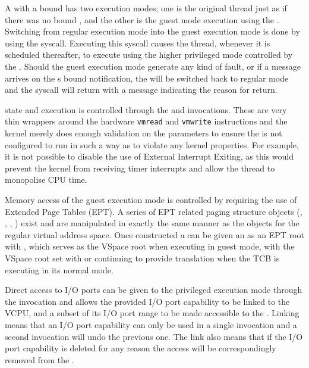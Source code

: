 A  with a bound  has two execution modes; one is the original thread just as
if there was no bound , and the other is the guest mode execution using the
. Switching from regular execution mode into the guest execution mode is
done by using the  syscall. Executing this syscall causes the thread, whenever
it is scheduled thereafter, to execute using the higher privileged mode controlled by the .
Should the guest execution mode generate any kind of fault, or if a message arrives
on the s bound notification, the  will be switched back to regular mode
and the  syscall will return with a message indicating the reason for return.

 state and execution is controlled through the 
and  invocations.
These are very thin wrappers around the hardware \texttt{vmread} and \texttt{vmwrite} instructions and the kernel
merely does enough validation on the parameters to ensure the  is not configured
to run in such a way as to violate any kernel properties. For example, it is not possible to
disable the use of External Interrupt Exiting, as this would prevent the kernel from receiving
timer interrupts and allow the thread to monopolise CPU time.

Memory access of the guest execution mode is controlled by requiring the use of Extended
Page Tables (EPT). A series of EPT related paging structure objects (, , , )
exist and are manipulated in exactly the same manner as the objects for the regular virtual
address space. Once constructed a  can be given an  as an EPT root with ,
which serves as the VSpace root when executing in guest mode, with the VSpace root set
with  or 
continuing to provide translation when the TCB is executing in its normal mode.

Direct access to I/O ports can be given to the privileged execution mode through the
 invocation and allows the provided I/O port capability to be
linked to the VCPU, and a subset of its I/O port range to be made accessible to the .
Linking means that an I/O port capability can only be used in a single 
invocation and a second invocation will undo the previous one. The link also means that
if the I/O port capability is deleted for any reason the access will be correspondingly removed
from the .
